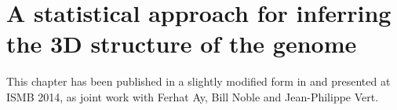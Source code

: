 


\chapter[Inferring the 3D structure of the genome]{A statistical approach for inferring the 3D structure of the genome}
\graphicspath{{2_chapter/figures/}}

\begin{work}

This chapter has been published in a slightly modified form in
\citep{varoquaux:statistical} and presented at ISMB 2014, as joint work with
Ferhat Ay, Bill Noble and Jean-Philippe Vert.

\end{work}


